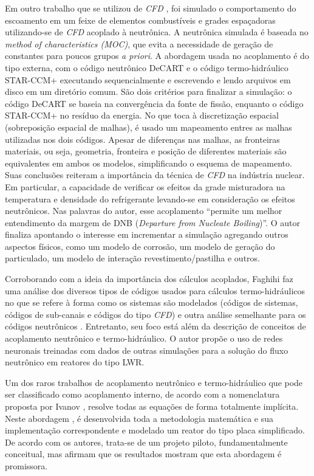 Em outro trabalho que se utilizou de \textit{CFD} \cite{Yan2011}, foi simulado o comportamento do escoamento em um feixe de elementos 
combustíveis e grades espaçadoras utilizando-se de \textit{CFD} acoplado à neutrônica. A neutrônica 
simulada é baseada no \textit{method of characteristics (MOC)}, que evita a necessidade de geração 
de constantes para poucos grupos \textit{a priori}. A abordagem usada no 
acoplamento é do tipo externa, com o código neutrônico DeCART e o código termo-hidráulico 
STAR-CCM+ executando sequencialmente e escrevendo e lendo arquivos em disco em um 
diretório comum. São dois critérios para finalizar a simulação: o código DeCART se baseia 
na convergência da fonte de fissão, enquanto o código STAR-CCM+ no resíduo da energia. No que toca à 
discretização espacial (sobreposição espacial de malhas), é usado um mapeamento entres as malhas 
utilizadas nos dois códigos. Apesar de diferenças nas malhas, as fronteiras materiais, ou seja, geometria, 
fronteira e posição de diferentes materiais são equivalentes em ambos os modelos, simplificando
o esquema de mapeamento. Suas conclusões reiteram a importância da técnica de \textit{CFD} na indústria nuclear. Em particular, 
a capacidade de verificar os efeitos da grade misturadora na temperatura e densidade do refrigerante 
levando-se em consideração os efeitos neutrônicos. Nas palavras do autor, esse acoplamento 
``permite um melhor entendimento da margem de DNB (\textit{Departure from Nucleate Boiling})''.
O autor finaliza apontando o interesse em incrementar a simulação 
agregando outros aspectos físicos, como um modelo de corrosão, um modelo de geração do particulado, 
um modelo de interação revestimento/pastilha e outros. %

Corroborando com a ideia da importância dos cálculos acoplados, Faghihi faz uma análise
dos diversos tipos de códigos usados para cálculos termo-hidráulicos no que se refere à
forma como os sistemas são modelados (códigos de sistemas, códigos de sub-canais e códigos
do tipo \textit{CFD}) e outra análise semelhante para os códigos neutrônicos \cite{Faghihi2011}. Entretanto, seu
foco está além da descrição de conceitos de acoplamento
neutrônico e termo-hidráulico. O autor propõe o uso de redes neuronais treinadas com dados de
outras simulações para a solução do fluxo neutrônico em reatores do tipo LWR.

Um dos raros trabalhos de acoplamento neutrônico e termo-hidráulico que pode ser classificado
como acoplamento interno, de acordo com a nomenclatura proposta por Ivanov \cite{Ivanov2007},
resolve todas as equações de forma totalmente implícita. Neste abordagem \cite{Pope2008}, é desenvolvida
toda a metodologia matemática e sua implementação correspondente e modelado um reator do tipo placa
simplificado. De acordo com os autores, trata-se de um projeto piloto, fundamentalmente
conceitual, mas afirmam que os resultados mostram que esta abordagem é promissora.


